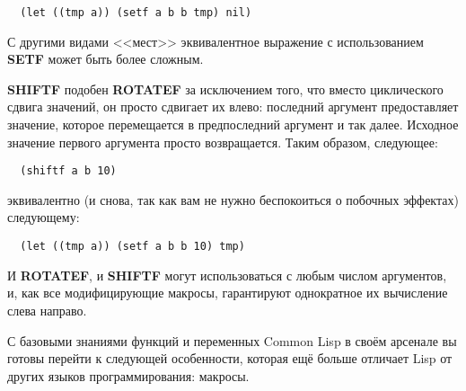 \begin{lstlisting}
  (let ((tmp a)) (setf a b b tmp) nil)
\end{lstlisting}

С другими видами <<мест>> эквивалентное выражение с использованием \textbf{SETF} может быть
более сложным.

\textbf{SHIFTF} подобен \textbf{ROTATEF} за исключением того, что вместо циклического
сдвига значений, он просто сдвигает их влево: последний аргумент предоставляет значение,
которое перемещается в предпоследний аргумент и так далее. Исходное значение первого
аргумента просто возвращается. Таким образом, следующее:

\begin{lstlisting}
  (shiftf a b 10)
\end{lstlisting}

эквивалентно (и снова, так как вам не нужно беспокоиться о побочных эффектах) следующему:

\begin{lstlisting}
  (let ((tmp a)) (setf a b b 10) tmp)
\end{lstlisting}

И \textbf{ROTATEF}, и \textbf{SHIFTF} могут использоваться с любым числом аргументов, и,
как все модифицирующие макросы, гарантируют однократное их вычисление слева направо.

С базовыми знаниями функций и переменных Common Lisp в своём арсенале вы готовы перейти к
следующей особенности, которая ещё больше отличает Lisp от других языков программирования:
макросы.

